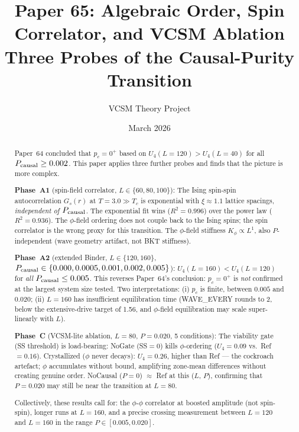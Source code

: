 \documentclass[12pt,a4paper]{article}
\title{\textbf{Paper 65: Algebraic Order, Spin Correlator, and VCSM Ablation\\
\large Three Probes of the Causal-Purity Transition}}
\author{VCSM Theory Project}
\date{March 2026}
\begin{document}
\maketitle

\begin{abstract}
Paper~64 concluded that $p_c = 0^+$ based on $U_4(L=120) > U_4(L=40)$
for all $P_{\rm causal} \geq 0.002$.
This paper applies three further probes and finds that the picture is more complex.

\textbf{Phase~A1} (spin-field correlator, $L \in \{60,80,100\}$):
The Ising spin-spin autocorrelation $G_s(r)$ at $T = 3.0 \gg T_c$
is exponential with $\xi \approx 1.1$ lattice spacings, \emph{independent of $P_{\rm causal}$}.
The exponential fit wins ($R^2 = 0.996$) over the power law ($R^2 = 0.936$).
The $\phi$-field ordering does not couple back to the Ising spins;
the spin correlator is the wrong proxy for this transition.
The $\phi$-field stiffness $K_\phi \propto L^1$, also $P$-independent
(wave geometry artifact, not BKT stiffness).

\textbf{Phase~A2} (extended Binder, $L \in \{120, 160\}$,
$P_{\rm causal} \in \{0.000, 0.0005, 0.001, 0.002, 0.005\}$):
$U_4(L=160) < U_4(L=120)$ for \emph{all} $P_{\rm causal} \leq 0.005$.
This reverses Paper~64's conclusion: $p_c = 0^+$ is \emph{not} confirmed
at the largest system size tested.
Two interpretations: (i) $p_c$ is finite, between $0.005$ and $0.020$;
(ii) $L=160$ has insufficient equilibration time
(WAVE\_EVERY rounds to 2, below the extensive-drive target of 1.56,
and $\phi$-field equilibration may scale super-linearly with $L$).

\textbf{Phase~C} (VCSM-lite ablation, $L=80$, $P=0.020$, 5 conditions):
The viability gate (SS threshold) is load-bearing:
NoGate (SS$=0$) kills $\phi$-ordering ($U_4 = 0.09$ vs.\ Ref $= 0.16$).
Crystallized ($\phi$ never decays): $U_4 = 0.26$, higher than Ref ---
the cockroach artefact; $\phi$ accumulates without bound,
amplifying zone-mean differences without creating genuine order.
NoCausal ($P=0$) $\approx$ Ref at this ($L$, $P$), confirming
that $P = 0.020$ may still be near the transition at $L=80$.

Collectively, these results call for:
the $\phi$-$\phi$ correlator at boosted amplitude (not spin-spin),
longer runs at $L=160$, and a precise crossing measurement
between $L=120$ and $L=160$ in the range $P \in [0.005, 0.020]$.
\end{abstract}

\end{document}
